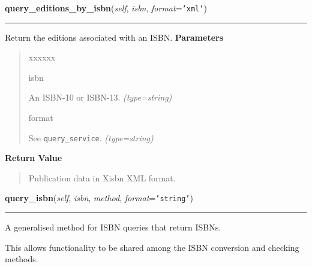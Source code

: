 \hspace{.8\funcindent}\begin{boxedminipage}{\funcwidth}

    \raggedright \textbf{query\_editions\_by\_isbn}(\textit{self}, \textit{isbn}, \textit{format}={\tt \texttt{'}\texttt{xml}\texttt{'}})

    \vspace{-1.5ex}

    \rule{\textwidth}{0.5\fboxrule}
\setlength{\parskip}{2ex}

Return the editions associated with an ISBN.
\setlength{\parskip}{1ex}
      \textbf{Parameters}
      \vspace{-1ex}

      \begin{quote}
        \begin{Ventry}{xxxxxx}

          \item[isbn]


An ISBN-10 or ISBN-13.
            {\it (type=string)}

          \item[format]


See \texttt{query{\_}service}.
            {\it (type=string)}

        \end{Ventry}

      \end{quote}

      \textbf{Return Value}
    \vspace{-1ex}

      \begin{quote}

Publication data in Xisbn XML format.
      \end{quote}

    \end{boxedminipage}

    \label{biblio:webquery:xisbn:XisbnQuery:query_isbn}

    \vspace{0.5ex}

\hspace{.8\funcindent}\begin{boxedminipage}{\funcwidth}

    \raggedright \textbf{query\_isbn}(\textit{self}, \textit{isbn}, \textit{method}, \textit{format}={\tt \texttt{'}\texttt{string}\texttt{'}})

    \vspace{-1.5ex}

    \rule{\textwidth}{0.5\fboxrule}
\setlength{\parskip}{2ex}

A generalised method for ISBN queries that return ISBNs.

This allows functionality to be shared among the ISBN conversion and
checking methods.
\setlength{\parskip}{1ex}
    \end{boxedminipage}

